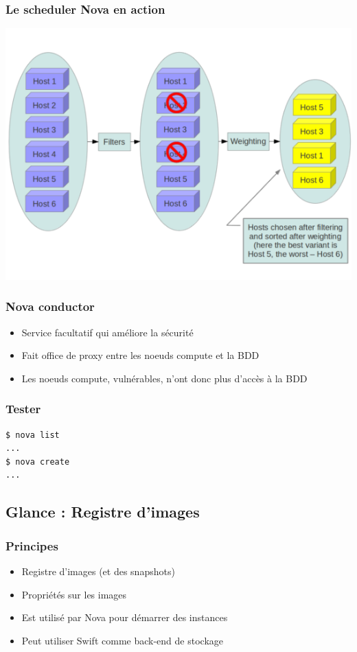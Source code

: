   \begin{frame}
    \frametitle{Le scheduler Nova en action}
    \includegraphics[width=\textwidth]{images/scheduling-schema.png}
  \end{frame}

  \begin{frame}
    \frametitle{Nova conductor}
    \begin{itemize}
      \item Service facultatif qui améliore la sécurité
      \item Fait office de proxy entre les noeuds compute et la BDD
      \item Les noeuds compute, vulnérables, n'ont donc plus d'accès à la BDD
    \end{itemize}
  \end{frame}

  \begin{frame}[containsverbatim]
    \frametitle{Tester}
\begin{verbatim}
$ nova list
...
$ nova create
...
\end{verbatim}
  \end{frame}

  \subsection[Glance]{Glance : Registre d'images}

  \begin{frame}
    \frametitle{Principes}
    \begin{itemize}
      \item Registre d'images (et des snapshots)
      \item Propriétés sur les images
      \item Est utilisé par Nova pour démarrer des instances
      \item Peut utiliser Swift comme back-end de stockage
    \end{itemize}
  \end{frame}

